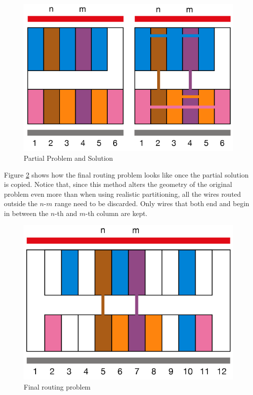 \begin{figure}[h!]
  \centering
  \includegraphics[scale=0.5]{img/design/Padmitja.png}
  \caption{Partial Problem and Solution}
  \label{fig:Padmitja}
\end{figure} 

Figure \ref{fig:Padfinal} shows how the final routing problem looks like once the partial solution is copied. Notice that, since this method alters the geometry of the original problem even more than when using realistic partitioning, all the wires routed outside the $n$-$m$ range need to be discarded. Only wires that both end and begin in between the $n$-th and $m$-th column are kept. \\

\begin{figure}[h!]
  \centering
  \includegraphics[scale=0.5]{img/design/Padfinal.png}
  \caption{Final routing problem}
  \label{fig:Padfinal}
\end{figure} 


